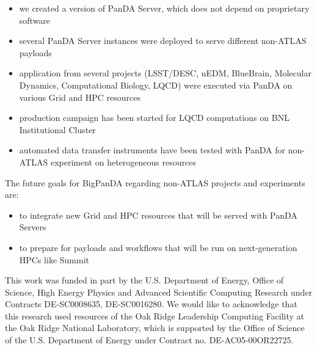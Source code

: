 \documentclass{webofc}
\begin{document}
\begin{itemize}
	\item we created a version of PanDA Server, which does not 	depend on proprietary software
	\item several PanDA Server instances were deployed to serve different non-ATLAS payloads
	\item application from several projects (LSST/DESC, nEDM, BlueBrain, Molecular Dynamics, Computational Biology, LQCD) were executed via PanDA on various Grid and HPC resources
	\item production campaign has been started for LQCD computations on BNL Institutional Cluster
	\item automated data transfer instruments have been tested with PanDA for non-ATLAS experiment on heterogeneous resources
\end{itemize}

The future goals for BigPanDA regarding non-ATLAS projects and experiments are:

\begin{itemize}
	\item to integrate new Grid and HPC resources that will be served with PanDA Servers
	\item to prepare for payloads and workflows that will be run on next-generation HPCs like Summit
\end{itemize}

\bigskip



\begin{acknowledgement}
	This work was funded in part by the U.S. Department of Energy, Office of Science, High Energy Physics and Advanced Scientific Computing Research under Contracts DE-SC0008635, DE-SC0016280. We would like to acknowledge that this research used resources of the Oak Ridge Leadership Computing Facility at the Oak Ridge National Laboratory, which is supported by the Office of Science of the U.S. Department of Energy under Contract no. DE-AC05-00OR22725.
\end{acknowledgement}


%

\end{document}
